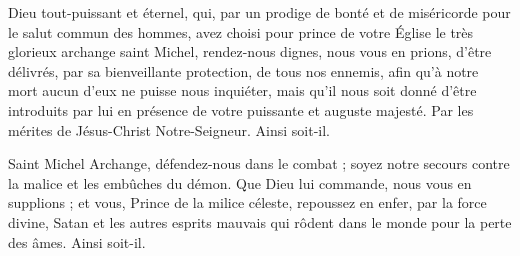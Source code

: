 \priere Dieu tout-puissant et éternel, qui, par un prodige de bonté et de miséricorde pour le salut commun des hommes, avez choisi pour prince de votre Église le très glorieux archange saint Michel, rendez-nous dignes, nous vous en prions, d’être délivrés, par sa bienveillante protection, de tous nos ennemis, afin qu’à notre mort aucun d’eux ne puisse nous inquiéter, mais qu’il nous soit donné d’être introduits par lui en présence de votre puissante et auguste majesté. Par les mérites de Jésus-Christ Notre-Seigneur. Ainsi soit-il.

\priere Saint Michel Archange, défendez-nous dans le combat ; soyez notre secours contre la malice et les embûches du démon. Que Dieu lui commande, nous vous en supplions ; et vous, Prince de la milice céleste, repoussez en enfer, par la force divine, Satan et les autres esprits mauvais qui rôdent dans le monde pour la perte des âmes. Ainsi soit-il.